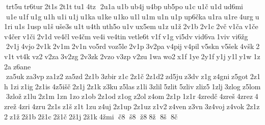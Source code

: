  trt5u tr6tur 2t1s 2t1t tu1 4tz  2u1a u1b ub4j u4bp ub5po u1c u1č u1d ud6mi  u1e u1f u1g u1h u1i u1j u1ka u1ke u1ko u1l u1m u1n u1p up6čka u1ra u1re 4urg u1ri u1s 1usp u1š uše3s u1t u4th uth5o u1v ux5em u1z u1ž 2v1b 2v1c 2vč v1ča v1če v4čer v1či 2v1d ve4čl ve4čm ve4i ve4tin vetle6t v1f v1g vi5dv vid6va 1viv vi6žg  2v1j 4vjo 2v1k 2v1m 2v1n vo5rd voz5le 2v1p 3v2pa v4pij v4pil v5skn v5šek 4všk 2v1t vt4k vz2 v2za 3v2zg 2v3zk 2vzo v3zp v2zu 1wa wo2 x1f 1ye 2y1f y1j y1l y1w 1z2a z6ane  za5uk za3vp za1z2 za5zd 2z1b 3zbir z1c 2z1č 2z1d2 zd5ju z3dv z1g z4gni z5got 2z1h 1zi z1ig 2z1is 4z5išč 2z1j 2z1k z3ku z5las z1li 3zlil 5zlit 5zliv zliz5 1zlj 3zlog z5lom 3zlož z1lu 2z1m 1zn 1zo z1ob 2z1od z1og z2ol z4om 2z1p 1z1r 4zredč 4zreš 4zrez 4zrež 4zri 4zru 2z1s z1š z1t 1zu z4uj 2z1up 2z1uz z1v2 z4ven z3vn 3z4voj z4vok 2z1z2 z1ž 2ž1b 2ž1c 2ž1č 2ž1j 2ž1k 4žmi  č8  š8  ž8 8ž  8š  8č 